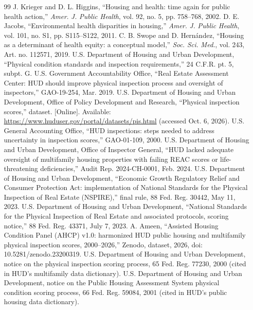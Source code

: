 \documentclass[10pt,twocolumn,letterpaper]{article}
\begin{document}
\begin{thebibliography}{99}\footnotesize\setlength{\itemsep}{0pt}\setlength{\parskip}{0pt}
 J. Krieger and D. L. Higgins, ``Housing and health: time again for public health action,'' \emph{Amer. J. Public Health}, vol. 92, no. 5, pp. 758--768, 2002.
 D. E. Jacobs, ``Environmental health disparities in housing,'' \emph{Amer. J. Public Health}, vol. 101, no. S1, pp. S115--S122, 2011.
 C. B. Swope and D. Hern\'andez, ``Housing as a determinant of health equity: a conceptual model,'' \emph{Soc. Sci. Med.}, vol. 243, Art. no. 112571, 2019.
 U.S. Department of Housing and Urban Development, ``Physical condition standards and inspection requirements,'' 24 C.F.R. pt. 5, subpt. G.
 U.S. Government Accountability Office, ``Real Estate Assessment Center: HUD should improve physical inspection process and oversight of inspectors,'' GAO-19-254, Mar. 2019.
 U.S. Department of Housing and Urban Development, Office of Policy Development and Research, ``Physical inspection scores,'' dataset. [Online]. Available: \url{https://www.huduser.gov/portal/datasets/pis.html} (accessed Oct. 6, 2026).
 U.S. General Accounting Office, ``HUD inspections: steps needed to address uncertainty in inspection scores,'' GAO-01-109, 2000.
 U.S. Department of Housing and Urban Development, Office of Inspector General, ``HUD lacked adequate oversight of multifamily housing properties with failing REAC scores or life-threatening deficiencies,'' Audit Rep. 2024-CH-0001, Feb. 2024.
 U.S. Department of Housing and Urban Development, ``Economic Growth Regulatory Relief and Consumer Protection Act: implementation of National Standards for the Physical Inspection of Real Estate (NSPIRE),'' final rule, 88 Fed. Reg. 30442, May 11, 2023.
 U.S. Department of Housing and Urban Development, ``National Standards for the Physical Inspection of Real Estate and associated protocols, scoring notice,'' 88 Fed. Reg. 43371, July 7, 2023.
 A. Ameen, ``Assisted Housing Condition Panel (AHCP) v1.0: harmonized HUD public housing and multifamily physical inspection scores, 2000--2026,'' Zenodo, dataset, 2026, doi: 10.5281/zenodo.23200319.
 U.S. Department of Housing and Urban Development, notice on the physical inspection scoring process, 65 Fed. Reg. 77230, 2000 (cited in HUD's multifamily data dictionary).
 U.S. Department of Housing and Urban Development, notice on the Public Housing Assessment System physical condition scoring process, 66 Fed. Reg. 59084, 2001 (cited in HUD's public housing data dictionary).

\end{thebibliography}
\end{document}
